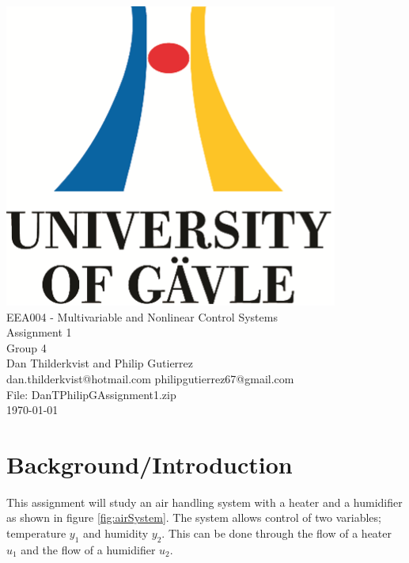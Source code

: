 \documentclass[a4paper, titlepage]{article}
\begin{document}
\begin{titlepage}
\begin{center}
\vspace*{1cm}
\includegraphics[scale=1.0]{../figures/hig_logo_eng.png}\\
\vspace{1.5cm}
\large EEA004 - Multivariable and Nonlinear Control Systems\\
\large Assignment 1\\
\vspace{1.5cm}
Group 4\\
Dan Thilderkvist and Philip Gutierrez\\
dan.thilderkvist@hotmail.com philipgutierrez67@gmail.com\\
File: DanTPhilipGAssignment1.zip\\
\vspace{1cm}
\today
\end{center}
\end{titlepage}



\section{Background/Introduction}
This assignment will study an air handling system with a heater and a humidifier as shown in figure \ref{fig:airSystem}.
The system allows control of two variables; temperature $y_1$ and humidity $y_2$.
This can be done through the flow of a heater $u_1$ and the flow of a humidifier $u_2$.
\end{document}

